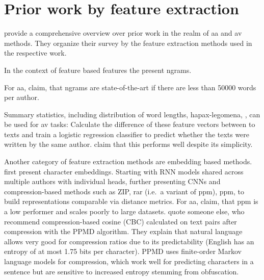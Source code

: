 \section{Prior work by feature extraction}
\label{sec:prior_work_by_feat_extraction}

\citet{tyo_state_2022} provide a comprehensive overview over prior work in the realm of \ac{aa} and \ac{av} methods.
They organize their survey by the feature extraction methods used in the respective work.

In the context of feature based features the present ngrams.

For \ac{aa}, \citet{tyo_state_2022} claim, that ngrams are state-of-the-art if there are less than 50000 words per author.

Summary statistics, including distribution of word lengths, hapax-legomena, , 
can be used for \ac{av} tasks: 
Calculate the difference of these feature vectors between to texts and train a logistic regression classifier 
to predict whether the texts were written by the same author.
\citet{tyo_state_2022} claim that this performs well despite its simplicity.


Another category of feature extraction methods are embedding based methods.
\citet{tyo_state_2022} first present character embeddings.
Starting with RNN models shared across multiple authors with individual heads, 
further presenting CNNs and %
compression-based methods such as ZIP, \ac{rar} (i.e.\ a variant of \ac{ppm}), \ac{ppm}, 
to build representations comparable via distance metrics.
For \ac{aa}, \citet{tyo_state_2022} claim, that \ac{ppm} is a low performer and scales poorly to large datasets.
\citet{bevendorff_divergence_based_2020} quote someone else, who recommend compression-based cosine (CBC) calculated on text pairs after compression with the PPMD algorithm.
They explain that natural language allows very good for compression ratios due to its predictability (English has an entropy of at most 1.75 bits per character).
PPMD uses finite-order Markov language models for compression, which work well for predicting characters in a sentence but are sensitive to increased entropy stemming from obfuscation.

